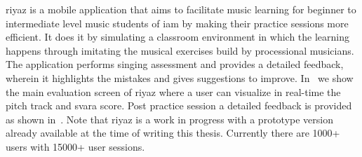 \gls{riyaz} is a mobile application that aims to facilitate music learning for beginner to intermediate level music students of \gls{iam} by making their practice sessions more efficient. It does it by simulating a classroom environment in which the learning happens through imitating the musical exercises build by processional musicians. The application performs singing assessment and provides a detailed feedback, wherein it highlights the mistakes and gives suggestions to improve. In~ we show the main evaluation screen of \gls{riyaz} where a user can visualize in real-time the pitch track and \gls{svara} score. Post practice session a detailed feedback is provided as shown in~.  Note that \gls{riyaz} is a work in progress with a prototype version already available at the time of writing this thesis. Currently there are 1000+ users with 15000+ user sessions. 

